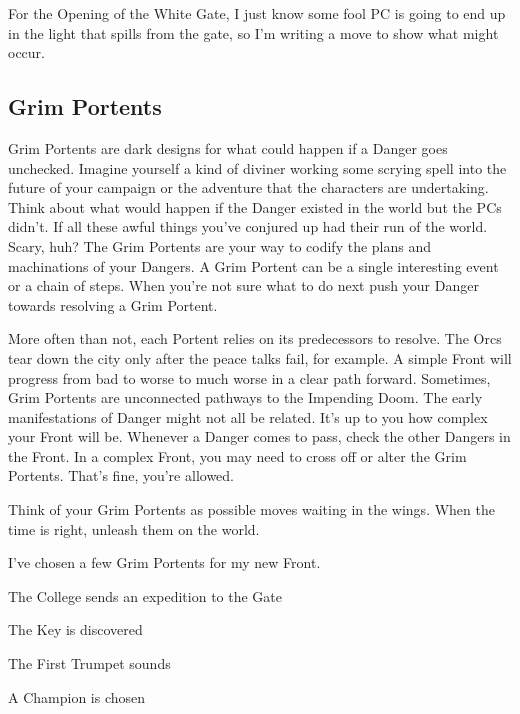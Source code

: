  
\startExample
For the Opening of the White Gate, I just know some fool PC is going to end up in the light that spills from the gate, so I'm writing a move to show what might occur.
\stopExample
 
\subsection{Grim Portents}    
 

Grim Portents are dark designs for what could happen if a Danger goes unchecked. Imagine yourself a kind of diviner working some scrying spell into the future of your campaign or the adventure that the characters are undertaking. Think about what would happen if the Danger existed in the world but the PCs didn’t. If all these awful things you’ve conjured up had their run of the world. Scary, huh? The Grim Portents are your way to codify the plans and machinations of your Dangers. A Grim Portent can be a single interesting event or a chain of steps. When you’re not sure what to do next push your Danger towards resolving a Grim Portent.

 

More often than not, each Portent relies on its predecessors to resolve. The Orcs tear down the city only after the peace talks fail, for example. A simple Front will progress from bad to worse to much worse in a clear path forward. Sometimes, Grim Portents are unconnected pathways to the Impending Doom. The early manifestations of Danger might not all be related. It's up to you how complex your Front will be. Whenever a Danger comes to pass, check the other Dangers in the Front. In a complex Front, you may need to cross off or alter the Grim Portents. That's fine, you're allowed.

 

Think of your Grim Portents as possible moves waiting in the wings. When the time is right, unleash them on the world.

 
\startExample
I've chosen a few Grim Portents for my new Front. 
\startitemize[1,packed]

\item The College sends an expedition to the Gate

 
\item The Key is discovered

 
\item The First Trumpet sounds

 
\item A Champion is chosen

